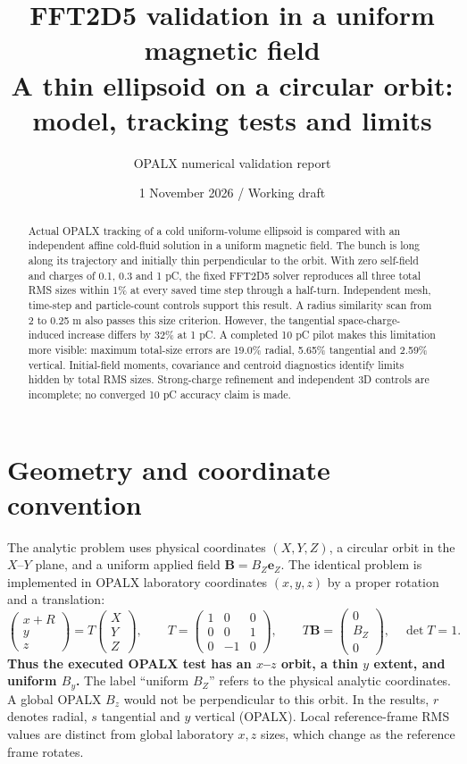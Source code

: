 \documentclass[10pt,a4paper]{article}
\title{\vspace{-1.4em}\textbf{FFT2D5 validation in a uniform magnetic field}\\[0.4em]
\large A thin ellipsoid on a circular orbit: model, tracking tests and limits}
\author{OPALX numerical validation report}
\date{1 November 2026 \quad / \quad Working draft}
\begin{document}
\maketitle
\vspace{-1em}
\begin{abstract}
Actual OPALX tracking of a cold uniform-volume ellipsoid is compared with an
independent affine cold-fluid solution in a uniform magnetic field. The bunch
is long along its trajectory and initially thin perpendicular to the orbit.
With zero self-field and charges of 0.1, 0.3 and 1 pC, the fixed FFT2D5 solver
reproduces all three total RMS sizes within 1\% at every saved time step through
a half-turn. Independent mesh, time-step and particle-count controls support
this result. A radius similarity scan from 2 to 0.25 m also passes this size
criterion. However, the tangential space-charge-induced increase differs by
32\% at 1 pC. A completed 10 pC pilot makes this limitation more visible:
maximum total-size errors are 19.0\% radial, 5.65\% tangential and 2.59\%
vertical. Initial-field moments, covariance and centroid diagnostics identify
limits hidden by total RMS sizes. Strong-charge refinement and independent
3D controls are incomplete; no converged 10 pC accuracy claim is made.
\end{abstract}

\section{Geometry and coordinate convention}
The analytic problem uses physical coordinates $(X,Y,Z)$, a circular orbit in
the $X$--$Y$ plane, and a uniform applied field $\bm B=B_Z\bm e_Z$.
The identical problem is implemented in OPALX laboratory coordinates $(x,y,z)$
by a proper rotation and a translation:
\begin{equation}
 \begin{pmatrix}x+R\\y\\z\end{pmatrix}
 =T\begin{pmatrix}X\\Y\\Z\end{pmatrix},\qquad
 T=\begin{pmatrix}1&0&0\\0&0&1\\0&-1&0\end{pmatrix},\qquad
 T\bm B=\begin{pmatrix}0\\B_Z\\0\end{pmatrix},\quad \det T=1.
 \label{eq:coordinates}
\end{equation}
\textbf{Thus the executed OPALX test has an $x$--$z$ orbit, a thin $y$ extent,
and uniform $B_y$.} The label ``uniform $B_Z$'' refers to the physical analytic
coordinates. A global OPALX $B_z$ would not be perpendicular to this orbit.
In the results, $r$ denotes radial, $s$ tangential and $y$ vertical (OPALX).
Local reference-frame RMS values are distinct from global laboratory $x,z$
sizes, which change as the reference frame rotates.
\end{document}
